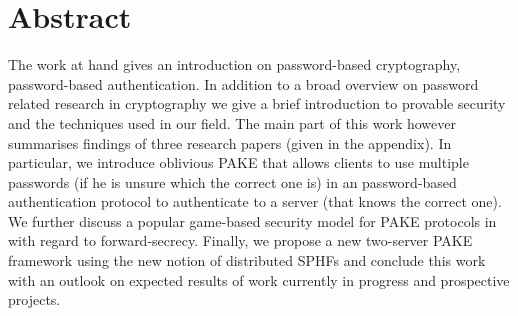 \cleardoublepage

\chapter*{Abstract}
The work at hand gives an introduction on password-based cryptography, \ie password-based authentication.
In addition to a broad overview on password related research in cryptography we give a brief introduction to provable security and the techniques used in our field.
The main part of this work however summarises findings of three research papers (given in the appendix).
In particular, we introduce oblivious \acl{PAKE} that allows clients to use multiple passwords (if he is unsure which the correct one is) in an password-based authentication protocol to authenticate to a server (that knows the correct one).
We further discuss a popular game-based security model for \ac{PAKE} protocols in with regard to forward-secrecy.
Finally, we propose a new two-server \ac{PAKE} framework using the new notion of distributed \aclp{SPHF} and conclude this work with an outlook on expected results of work currently in progress and prospective projects.

\vfill
